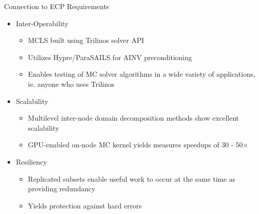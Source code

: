 \documentclass{beamer}
\begin{document}
\begin{frame}{Connection to ECP Requirements}

  \begin{itemize}

  \item Inter-Operability
    \begin{itemize}
    \item MCLS built using Trilinos solver API
    \item Utilizes Hypre/ParaSAILS for AINV preconditioning
    \item Enables testing of MC solver algorithms in a wide variety of
      applications, ie. anyone who uses Trilinos
    \end{itemize}

  \item Scalability
    \begin{itemize}
    \item Multilevel inter-node domain decomposition methods show excellent
      scalability
    \item GPU-enabled on-node MC kernel yields measures speedups of 30 -
      50$\times$
    \end{itemize}

  \item Resiliency
    \begin{itemize}
    \item Replicated subsets enable useful work to occur at the same time as
      providing redundancy
    \item Yields protection against hard errors
    \end{itemize}
  \end{itemize}

\end{frame}

\end{document}
